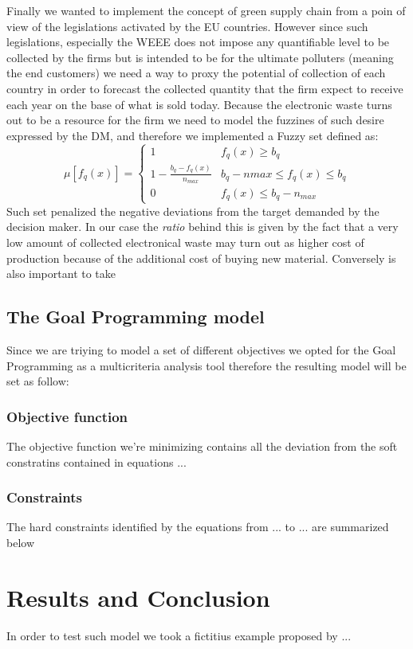 \documentclass{article}
\begin{document}
Finally we wanted to implement the concept of green supply chain from a poin of view of the legislations activated by the EU countries. However since such legislations, especially the WEEE does not impose any quantifiable level to be collected by the firms but is intended to be for the ultimate polluters (meaning the end customers) we need a way to proxy the potential of collection of each country in order to forecast the collected quantity that the firm expect to receive each year on the base of what is sold today. Because the electronic waste turns out to be a resource for the firm we need to model the fuzzines of such desire expressed by the DM, and therefore we implemented a Fuzzy set\cite{Zadeh_1965} defined as:
$$
\mu [f_q(x)]=
\begin{cases}
1 & f_q(x) \geq b_q \\
1-\frac{b_q-f_q(x)}{n_{max}} & b_q -n{max} \leq f_q(x) \leq b_q \\
0 & f_q(x) \leq b_q - n_{max}
\end{cases}
$$
Such set penalized the negative deviations from the target demanded by the decision maker. In our case the \textit{ratio} behind this is given by the fact that a very low amount of collected electronical waste may turn out as higher cost of production because of the additional cost of buying new material. Conversely is also important to take


\subsection{The Goal Programming model}
Since we are triying to model a set of different objectives we opted for the Goal Programming as a multicriteria analysis tool therefore the resulting model will be set as follow: 



\subsubsection{Objective function}
The objective function we're minimizing contains all the deviation from the soft constratins contained in equations ... 
\subsubsection{Constraints}
The hard constraints identified by the equations from ... to ... are summarized below 


\section{Results and Conclusion}
In order to test such model we took a fictitius example proposed by ...

\pagebreak

\printbibliography
\end{document}
